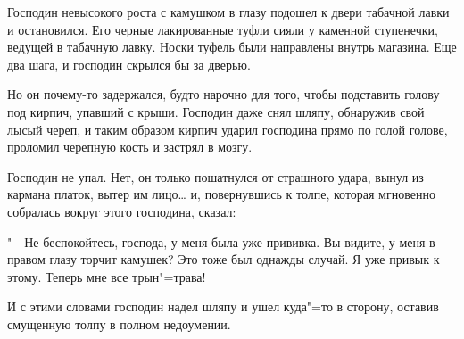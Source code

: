 Господин невысокого роста с камушком в глазу подошел к двери табачной лавки и остановился. Его черные лакированные туфли сияли у каменной ступенечки, ведущей в табачную лавку. Носки туфель были направлены внутрь магазина. Еще два шага, и господин скрылся бы за дверью.

Но он почему-то задержался, будто нарочно для того, чтобы подставить голову под кирпич, упавший с крыши. Господин даже снял шляпу, обнаружив свой лысый череп, и таким образом кирпич ударил господина прямо по голой голове, проломил черепную кость и застрял в мозгу.

Господин не упал. Нет, он только пошатнулся от страшного удара, вынул из кармана платок, вытер им лицо\dots{} и, повернувшись к толпе, которая мгновенно собралась вокруг этого господина, сказал:

"--~Не беспокойтесь, господа, у меня была уже прививка. Вы видите, у меня в правом глазу торчит камушек? Это тоже был однажды случай. Я уже привык к этому. Теперь мне все трын"=трава!

И с этими словами господин надел шляпу и ушел куда"=то в сторону, оставив смущенную толпу в полном недоумении.
